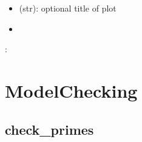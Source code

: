 \documentclass[letterpaper,10pt,english]{sphinxmanual}
\begin{document}
\begin{fulllineitems}
\begin{description}
\begin{itemize}
\item {} 
 (str): optional title of plot

\end{itemize}

\item[{\sphinxstylestrong{returns}::}] \leavevmode\begin{itemize}
\item {} 

\end{itemize}

\end{description}

:

\begin{sphinxVerbatim}[commandchars=\\\{\}]
  
  
\end{sphinxVerbatim}

\end{fulllineitems}



\section{ModelChecking}
\label{\detokenize{ModelChecking::doc}}\label{\detokenize{ModelChecking:modelchecking}}\label{\detokenize{ModelChecking:id1}}

\subsection{check\_primes}
\label{\detokenize{ModelChecking:id2}}\label{\detokenize{ModelChecking:check-primes}}
\end{document}
